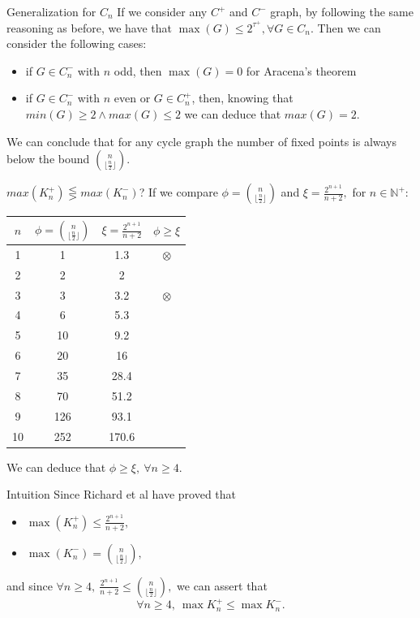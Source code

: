 \documentclass{beamer}
\newcommand{\floor}[1]{\lfloor #1 \rfloor}
\begin{document}
\begin{frame}{Generalization for $C_n$}
    \justifying
    If we consider any $C^+$ and $C^-$ graph, by following the same reasoning as before, we have that $\max(G)\leq 2^{\tau^+}, \forall G \in C_n.$ Then we can consider the following cases:
    \begin{itemize}
        \justifying
        \item if $G \in C_n^-$ with $n$ odd, then $\max(G)=0$ for Aracena's theorem 
        \item if $ G \in C_n^-$ with $n$ even or $G \in C_n^+$, then, knowing that $min(G) \geq 2 \land max(G) \leq 2$ we can deduce that $max(G)=2.$
    \end{itemize}
    
    We can conclude that for any cycle graph the number of fixed points is always below the bound $\binom{n}{\floor{\frac{n}{2}}}.$
\end{frame}

\begin{frame}{$max(K_n^+) \lesseqgtr max(K_n^-)$?}
\justifying
    If we compare $\phi = \binom{n}{\floor{\frac{n}{2}}}$ and $\xi =\frac{2^{n+1}}{n+2},$ for $n \in \mathbb{N}^+:$
    \small{
    \begin{table}
		\begin{tabular}{c|c|c|c}
		$n$ & $\phi = \binom{n}{\floor{\frac{n}{2}}}$ &  $\xi =\frac{2^{n+1}}{n+2}$ & $\phi \geq \xi$ \\\hline
		1 & 1 & 1.3 & $\otimes$\\
		2 & 2 & 2 & \checkmark\\
		3 & 3 & 3.2 & $\otimes$\\
		4 & 6 & 5.3 &\checkmark\\
		5 & 10 & 9.2 &\checkmark\\
		6 & 20 & 16 &\checkmark\\
		7 & 35 & 28.4 & \checkmark\\
		8 & 70 & 51.2 & \checkmark\\
		9 & 126 & 93.1 & \checkmark\\
		10 & 252 & 170.6 & \checkmark\\
		\end{tabular}
	\end{table}
	}
	We can deduce that $\phi \geq \xi,\ \forall n \geq 4.$
\end{frame}

\begin{frame}{Intuition}
\justifying
    Since Richard et al have proved that 
    \begin{itemize}
        \item $\max(K_n^+) \leq \frac{2^{n+1}}{n+2},$
        \item $\max(K_n^-) = \binom{n}{\floor{\frac{n}{2}}},$
    \end{itemize}
    and since $\forall n\geq 4,\ \frac{2^{n+1}}{n+2} \leq \binom{n}{\floor{\frac{n}{2}}},$ we can assert that
    \begin{equation}
        \label{eq:maxKorder}
        \forall n\geq 4,\ \max{K_n^+} \leq \max{K_n^-}.
    \end{equation}
\end{frame}
\end{document}
